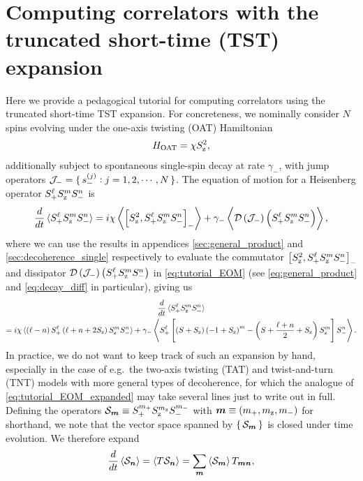 \section{Computing correlators with the truncated short-time (TST)
  expansion}
\label{sec:tutorial}

Here we provide a pedagogical tutorial for computing correlators using
the truncated short-time TST expansion.  For concreteness, we
nominally consider $N$ spins evolving under the one-axis twisting
(OAT) Hamiltonian
\begin{align}
  H_{\text{OAT}} = \chi S_{\text{z}}^2,
\end{align}
additionally subject to spontaneous single-spin decay at rate
$\gamma_-$, with jump operators $\mathcal{J}_-=\set{s_-^{(j)}:j=1,2,\cdots,N}$.
The equation of motion for a Heisenberg operator
$S_+^\ell S_{\text{z}}^m S_-^n$ is
\begin{align}
  \dfrac{d}{dt} \braket{S_+^\ell S_{\text{z}}^m S_-^n}
  = i\chi\Braket{\left[ S_{\text{z}}^2, S_+^\ell S_{\text{z}}^m S_-^n \right]_-}
  + \gamma_- \Braket{\mathcal{D}\left( \mathcal{J}_- \right) \left( S_+^\ell S_{\text{z}}^m S_-^n \right)},
  \label{eq:tutorial_EOM}
\end{align}
where we can use the results in appendices \ref{sec:general_product}
and \ref{sec:decoherence_single} respectively to evaluate the
commutator $\left[ S_{\text{z}}^2, S_+^\ell S_{\text{z}}^m S_-^n \right]_-$ and dissipator
$\mathcal{D}\left( \mathcal{J}_- \right) \left( S_+^\ell S_{\text{z}}^m S_-^n \right)$ in \eqref{eq:tutorial_EOM} (see
\eqref{eq:general_product} and \eqref{eq:decay_diff} in particular),
giving us
\begin{multline}
  \dfrac{d}{dt} \braket{S_+^\ell S_{\text{z}}^m S_-^n} \\
  = i\chi \braket{\left( \ell-n \right) S_+^\ell \left( \ell+n+2S_{\text{z}} \right) S_{\text{z}}^m S_-^n}
  + \gamma_- \Braket{S_+^\ell \left[ \left( S+S_{\text{z}} \right)\left( -1+S_{\text{z}} \right)^m
      - \left( S+\dfrac{\ell+n}{2}+S_{\text{z}} \right) S_{\text{z}}^m \right] S_-^n}.
  \label{eq:tutorial_EOM_expanded}
\end{multline}
In practice, we do not want to keep track of such an expansion by
hand, especially in the case of e.g.~the two-axis twisting (TAT) and
twist-and-turn (TNT) models with more general types of decoherence,
for which the analogue of \eqref{eq:tutorial_EOM_expanded} may take
several lines just to write out in full.  Defining the operators
$\mathcal{S}_{\bm m}\equiv S_+^{m_+} S_{\text{z}}^{m_{\text{z}}} S_-^{m_-}$ with
$\bm m\equiv\left( m_+,m_{\text{z}},m_- \right)$ for shorthand, we note that the vector
space spanned by $\set{\mathcal{S}_{\bm m}}$ is closed under time evolution.  We
therefore expand
\begin{align}
  \dfrac{d}{dt} \braket{\mathcal{S}_{\bm n}}
  = \braket{T \mathcal{S}_{\bm n}}
  = \sum_{\bm m} \braket{\mathcal{S}_{\bm m}} T_{\bm m\bm n},
  \label{eq:tutorial_EOM_general}
\end{align}
